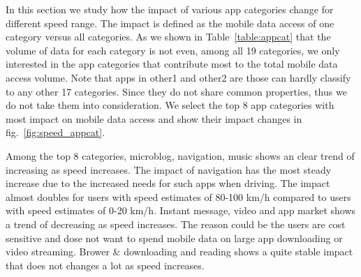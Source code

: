 In this section we study how the impact of various app categories change for different speed range. The impact is defined as the mobile data access of one category versus all categories. As we shown in Table~\ref{table:appcat} that the volume of data for each category is not even, among all 19 categories, we only interested in the app categories that contribute most to the total mobile data access volume. Note that apps in other1 and other2 are those can hardly classify to any other 17 categories. Since they do not share common properties, thus we do not take them into consideration. We select the top 8 app categories with most impact on mobile data access and show their impact changes in fig.~\ref{fig:speed_appcat}. 

Among the top 8 categories, microblog, navigation, music shows an clear trend of increasing as speed increases. The impact of navigation has the most steady increase due to the increased needs for such apps when driving. The impact almost doubles for users with speed estimates of 80-100 km/h compared to users with speed estimates of 0-20 km/h. Instant message, video and app market shows a trend of decreasing as speed increases. The reason could be the users are cost sensitive and dose not want to spend mobile data on large app downloading or video streaming. Brower \& downloading and reading shows a quite stable impact that does not changes a lot as speed increases.
